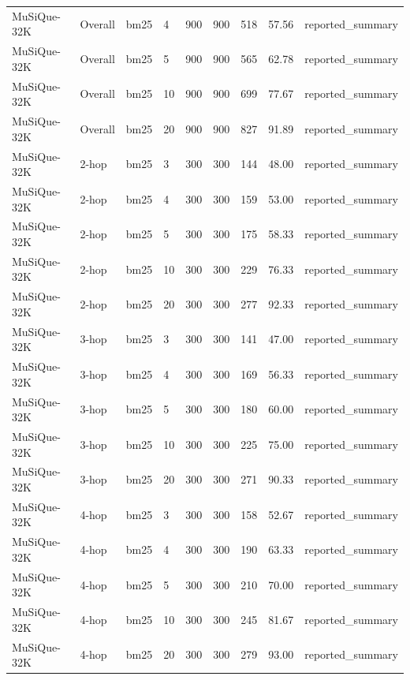 \begin{tabular}{lllllllll}
MuSiQue-32K & Overall & bm25 & 4 & 900 & 900 & 518 & 57.56 & reported\_summary \\
MuSiQue-32K & Overall & bm25 & 5 & 900 & 900 & 565 & 62.78 & reported\_summary \\
MuSiQue-32K & Overall & bm25 & 10 & 900 & 900 & 699 & 77.67 & reported\_summary \\
MuSiQue-32K & Overall & bm25 & 20 & 900 & 900 & 827 & 91.89 & reported\_summary \\
MuSiQue-32K & 2-hop & bm25 & 3 & 300 & 300 & 144 & 48.00 & reported\_summary \\
MuSiQue-32K & 2-hop & bm25 & 4 & 300 & 300 & 159 & 53.00 & reported\_summary \\
MuSiQue-32K & 2-hop & bm25 & 5 & 300 & 300 & 175 & 58.33 & reported\_summary \\
MuSiQue-32K & 2-hop & bm25 & 10 & 300 & 300 & 229 & 76.33 & reported\_summary \\
MuSiQue-32K & 2-hop & bm25 & 20 & 300 & 300 & 277 & 92.33 & reported\_summary \\
MuSiQue-32K & 3-hop & bm25 & 3 & 300 & 300 & 141 & 47.00 & reported\_summary \\
MuSiQue-32K & 3-hop & bm25 & 4 & 300 & 300 & 169 & 56.33 & reported\_summary \\
MuSiQue-32K & 3-hop & bm25 & 5 & 300 & 300 & 180 & 60.00 & reported\_summary \\
MuSiQue-32K & 3-hop & bm25 & 10 & 300 & 300 & 225 & 75.00 & reported\_summary \\
MuSiQue-32K & 3-hop & bm25 & 20 & 300 & 300 & 271 & 90.33 & reported\_summary \\
MuSiQue-32K & 4-hop & bm25 & 3 & 300 & 300 & 158 & 52.67 & reported\_summary \\
MuSiQue-32K & 4-hop & bm25 & 4 & 300 & 300 & 190 & 63.33 & reported\_summary \\
MuSiQue-32K & 4-hop & bm25 & 5 & 300 & 300 & 210 & 70.00 & reported\_summary \\
MuSiQue-32K & 4-hop & bm25 & 10 & 300 & 300 & 245 & 81.67 & reported\_summary \\
MuSiQue-32K & 4-hop & bm25 & 20 & 300 & 300 & 279 & 93.00 & reported\_summary \\
\hline
\end{tabular}
